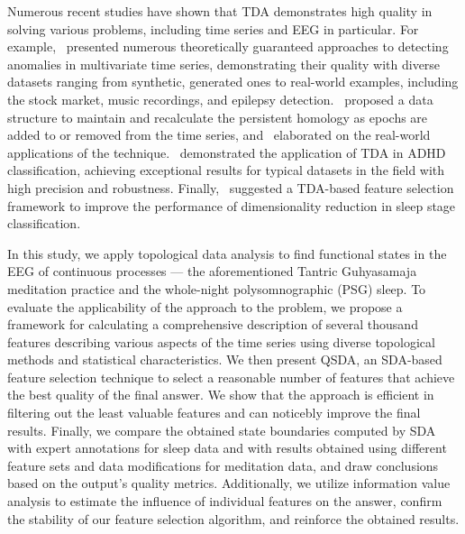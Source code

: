 \documentclass[pdflatex,sn-basic,Numbered]{sn-jnl}
\begin{document}
Numerous recent studies have shown that TDA demonstrates high quality in solving various problems, including time series and EEG in particular. For example,~\cite{chazal2024topologicalanalysisdetectinganomalies,rai2024identifyingextremeeventsstock,heo2024persistenthomologyfeaturedtime,chrétien2024timetopologicalanalysiseeg} presented numerous theoretically guaranteed approaches to detecting anomalies in multivariate time series, demonstrating their quality with diverse datasets ranging from synthetic, generated ones to real-world examples, including the stock market, music recordings, and epilepsy detection.~\cite{dimontesano2024dynamicallymaintainingpersistenthomology} proposed a data structure to maintain and recalculate the persistent homology as epochs are added to or removed from the time series, and~\cite{ost2024bananatreespersistencetime} elaborated on the real-world applications of the technique.~\cite{cai2024topologicalfeaturesearchmethod} demonstrated the application of TDA in ADHD classification, achieving exceptional results for typical datasets in the field with high precision and robustness. Finally,~\cite{deng2024twostagehierarchicalexplainablefeature} suggested a TDA-based feature selection framework to improve the performance of dimensionality reduction in sleep stage classification.

In this study, we apply topological data analysis to find functional states in the EEG of continuous processes --- the aforementioned Tantric Guhyasamaja meditation practice and the whole-night polysomnographic (PSG) sleep. To evaluate the applicability of the approach to the problem, we propose a framework for calculating a comprehensive description of several thousand features describing various aspects of the time series using diverse topological methods and statistical characteristics. We then present QSDA, an SDA-based feature selection technique to select a reasonable number of features that achieve the best quality of the final answer. We show that the approach is efficient in filtering out the least valuable features and can noticebly improve the final results. Finally, we compare the obtained state boundaries computed by SDA with expert annotations for sleep data and with results obtained using different feature sets and data modifications for meditation data, and draw conclusions based on the output's quality metrics. Additionally, we utilize information value analysis to estimate the influence of individual features on the answer, confirm the stability of our feature selection algorithm, and reinforce the obtained results.
\end{document}
